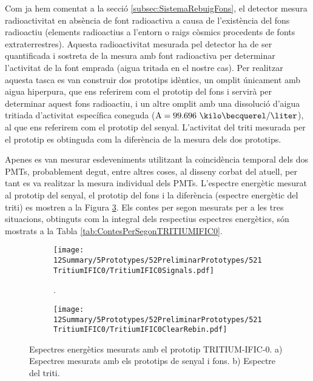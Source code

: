 Com ja hem comentat a la secció \ref{subsec:SistemaRebuigFons}, el detector mesura radioactivitat en absència de font radioactiva a causa de l'existència del fons radioactiu (elements radioactius a l'entorn o raigs còsmics procedents de fonts extraterrestres). Aquesta radioactivitat mesurada pel detector ha de ser quantificada i sostreta de la mesura amb font radioactiva per determinar l'activitat de la font emprada (aigua tritada en el nostre cas). Per realitzar aquesta tasca es van construir dos prototips idèntics, un omplit únicament amb aigua hiperpura, que ens referirem com el prototip del fons i servirà per determinar aquest fons radioactiu, i un altre omplit amb una dissolució d'aigua tritiada d'activitat específica coneguda ($\text{A}=99.696~\kilo\becquerel/\liter$), al que ens referirem com el prototip del senyal. L'activitat del triti mesurada per el prototip es obtinguda com la diferència de la mesura dels dos prototips.

Apenes es van mesurar esdeveniments utilitzant la coincidència temporal dels dos PMTs, probablement degut, entre altres coses, al disseny corbat del atuell, per tant es va realitzar la mesura individual dels PMTs. L'espectre energètic mesurat al prototip del senyal, el prototip del fons i la diferència (espectre energètic del triti) es mostren a la Figura \ref{fig:EspectresEnergeticsTritiumIFIC0}. Els contes per segon mesurats per a les tres situacions, obtinguts com la integral dels respectius espectres energètics, són mostrats a la Tabla \ref{tab:ContesPerSegonTRITIUMIFIC0}. 

\begin{figure}
\centering
    \begin{subfigure}[b]{1\textwidth}
    \centering
    \texttt{[image: 12Summary/5Prototypes/52PreliminarPrototypes/521TritiumIFIC0/TritiumIFIC0Signals.pdf]}  
    \caption{.\label{subfig:EspectreSenyalFonsTritiumIFIC0}}
    \end{subfigure}
    \hfill
    \begin{subfigure}[b]{1\textwidth}
    \centering
    \texttt{[image: 12Summary/5Prototypes/52PreliminarPrototypes/521TritiumIFIC0/TritiumIFIC0ClearRebin.pdf]}  
    \caption{\label{subfig:EspectreTritiTritiumIFIC0}}
    \end{subfigure}
 \caption{Espectres energètics mesurats amb el prototip TRITIUM-IFIC-0. a) Espectres mesurats amb els prototips de senyal i fons. b) Espectre del triti.}
 \label{fig:EspectresEnergeticsTritiumIFIC0}
\end{figure}

